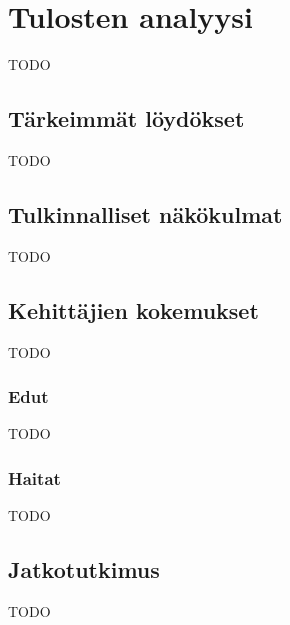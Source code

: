 \vspace{21.5pt}
\chapter{Tulosten analyysi}
TODO

\section{Tärkeimmät löydökset}

TODO

\section{Tulkinnalliset näkökulmat}

TODO


\section{Kehittäjien kokemukset}

TODO

\subsection{Edut}

TODO

\subsection{Haitat}

TODO

\section{Jatkotutkimus}

TODO